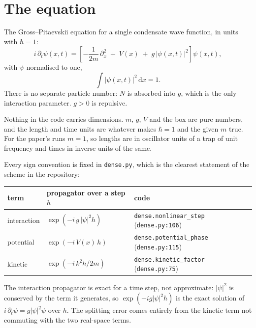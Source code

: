 \documentclass[11pt,a4paper]{article}
\newcommand{\code}[1]{\texttt{#1}}
\newcommand{\dd}{\mathrm{d}}
\begin{document}
\section{The equation}

The Gross--Pitaevskii equation for a single condensate wave function, in units with
$\hbar = 1$:
\begin{equation}
  i\,\partial_t \psi(x,t)
  = \left[ -\frac{1}{2m}\,\partial_x^2 \;+\; V(x) \;+\; g\,|\psi(x,t)|^2 \right]\psi(x,t),
  \label{eq:gp}
\end{equation}
with $\psi$ normalised to one,
\begin{equation}
  \int |\psi(x,t)|^2\,\dd x = 1 .
\end{equation}
There is no separate particle number: $N$ is absorbed into $g$, which is the only
interaction parameter. $g > 0$ is repulsive.

Nothing in the code carries dimensions. $m$, $g$, $V$ and the box are pure numbers,
and the length and time units are whatever makes $\hbar = 1$ and the given $m$ true.
For the paper's runs $m = 1$, so lengths are in oscillator units of a trap of unit
frequency and times in inverse units of the same.

Every sign convention is fixed in \code{dense.py}, which is the clearest statement of
the scheme in the repository:

\begin{center}
\begin{tabular}{@{}lll@{}}
\toprule
term & propagator over a step $h$ & code \\
\midrule
interaction & $\exp\!\left(-i\,g\,|\psi|^2 h\right)$    & \code{dense.nonlinear\_step} (\code{dense.py:106}) \\
potential   & $\exp\!\left(-i\,V(x)\,h\right)$          & \code{dense.potential\_phase} (\code{dense.py:115}) \\
kinetic     & $\exp\!\left(-i\,k^2 h / 2m\right)$       & \code{dense.kinetic\_factor} (\code{dense.py:75}) \\
\bottomrule
\end{tabular}
\end{center}

The interaction propagator is exact for a time step, not approximate: $|\psi|^2$ is
conserved by the term it generates, so $\exp(-i g |\psi|^2 h)$ is the exact solution
of $i\,\partial_t\psi = g|\psi|^2\psi$ over $h$. The splitting error comes entirely
from the kinetic term not commuting with the two real-space terms.
\end{document}

